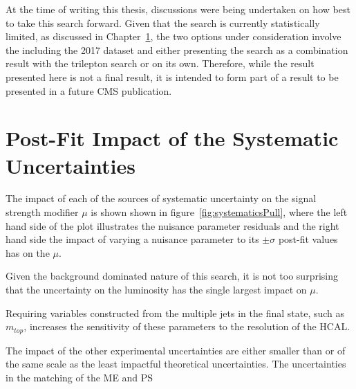 At the time of writing this thesis, discussions were being undertaken on how best to take this search forward.
Given that the search is currently statistically limited, as discussed in Chapter~\ref{sec:uncertainitiesImpact}, the two options under consideration involve the including the 2017 dataset and either presenting the search as a combination result with the trilepton search or on its own.
Therefore, while the result presented here is not a final result, it is intended to form part of a result to be presented in a future CMS publication.

\section{Post-Fit Impact of the Systematic Uncertainties}\label{sec:uncertainitiesImpact}
The impact of each of the sources of systematic uncertainty on the signal strength modifier $\mu$ is shown shown in figure~\ref{fig:systematicsPull}, where the left hand side of the plot illustrates the nuisance parameter residuals and the right hand side the impact of varying a nuisance parameter to its $\pm \sigma$ post-fit values has on the $\mu$.

Given the background dominated nature of this search, it is not too surprising that the uncertainty on the luminosity has the single largest impact on $\mu$.

Requiring variables constructed from the multiple jets in the final state, such as $m_{top}$, increases the sensitivity of these parameters to the resolution of the HCAL.

The impact of the other experimental uncertainties are either smaller than or of the same scale as the least impactful theoretical uncertainties.
The uncertainties in the matching of the ME and PS 
 

